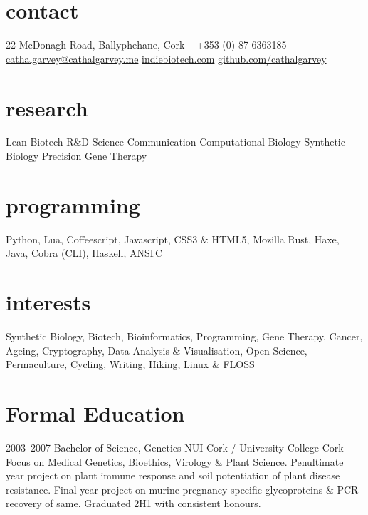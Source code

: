 \documentclass[]{friggeri-cv} %
\begin{document}


\begin{aside} %
\section{contact}
22 McDonagh Road,
Ballyphehane,
Cork
~
+353 (0) 87 6363185
~
\href{mailto:cathalgarvey@cathalgarvey.me}{cathalgarvey@cathalgarvey.me}
\href{http://www.indiebiotech.com}{indiebiotech.com}
\href{https://www.github.com/cathalgarvey}{github.com/cathalgarvey}
~
\section{research}
Lean Biotech R\&D
Science Communication
Computational Biology
Synthetic Biology
Precision Gene Therapy
~
\section{programming}
Python, Lua, Coffeescript, Javascript, CSS3 \& HTML5, Mozilla Rust, Haxe, Java, Cobra (CLI), Haskell, ANSI\,C
~
\section{interests}
Synthetic Biology, Biotech, Bioinformatics, Programming, Gene Therapy, Cancer, Ageing, Cryptography, Data Analysis \& Visualisation, Open Science, Permaculture, Cycling, Writing, Hiking, Linux \& FLOSS
\end{aside}


\section{Formal Education}

\begin{entrylist}
\entry
{2003--2007}
{Bachelor of Science, Genetics}
{NUI-Cork / University College Cork}
{Focus on Medical Genetics, Bioethics, Virology \& Plant Science.
Penultimate year project on plant immune response and soil potentiation of plant
disease resistance. Final year project on murine pregnancy-specific glycoproteins \&
PCR recovery of same. Graduated 2H1 with consistent honours.
}

\end{entrylist}
\end{document}

